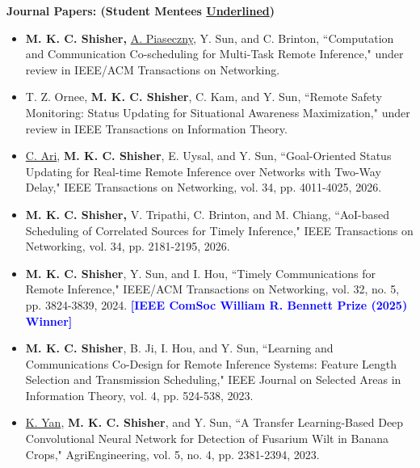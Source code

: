 \documentclass[letterpaper,11pt]{article}
\begin{document}
\vspace{5pt}
{\bf Journal Papers: (Student Mentees \underline{Underlined})}\\
\vspace{-5pt}
{\justifying
\begin{itemize}
 \setlength\itemsep{-2pt}
   \item[J7.] \textbf{M. K. C. Shisher,} \underline{A. Piaseczny}, Y. Sun, and C. Brinton, 
``Computation and Communication Co-scheduling for Multi-Task Remote Inference," under review in {IEEE/ACM Transactions on Networking}. 
 
 \item[J6.] T. Z. Ornee, \textbf{M. K. C. Shisher}, C. Kam, and Y. Sun,
``Remote Safety Monitoring: Status Updating for Situational Awareness Maximization," under review in {IEEE Transactions on Information Theory}. 

\item[J5.] \underline{C. Ari}, \textbf{M. K. C. Shisher}, E. Uysal, and Y. Sun,
``Goal-Oriented Status Updating for Real-time Remote Inference over Networks with Two-Way Delay," IEEE Transactions on Networking, vol. 34, pp. 4011-4025, 2026.
  \item[J4.] \textbf{M. K. C. Shisher,} V. Tripathi, C. Brinton, and M. Chiang,
``AoI-based Scheduling of Correlated Sources for Timely Inference," {IEEE Transactions on Networking}, vol. 34, pp. 2181-2195, 2026.

\item[J3.] {\bf M. K. C. Shisher}, Y. Sun, and I. Hou,
``Timely Communications for Remote Inference," {IEEE/ACM Transactions on Networking}, vol. 32, no. 5, pp. 3824-3839, {2024}. \textcolor{blue}{\bf [IEEE ComSoc William R. Bennett Prize (2025) Winner]}

\item[J2.] \textbf{M. K. C. Shisher}, B. Ji, I. Hou, and Y. Sun,
``Learning and Communications Co-Design for Remote Inference Systems: Feature Length Selection and Transmission Scheduling," {IEEE Journal on Selected Areas in Information Theory}, vol. 4, pp. 524-538, {2023}.

\item[J1.] \underline{K. Yan}, \textbf{M. K. C. Shisher}, and Y. Sun,
``A Transfer Learning-Based Deep Convolutional Neural Network
for Detection of Fusarium Wilt in Banana Crops," {AgriEngineering}, vol. 5, no. 4, pp. 2381-2394, {2023}. 
\end{itemize}}
\end{document}
